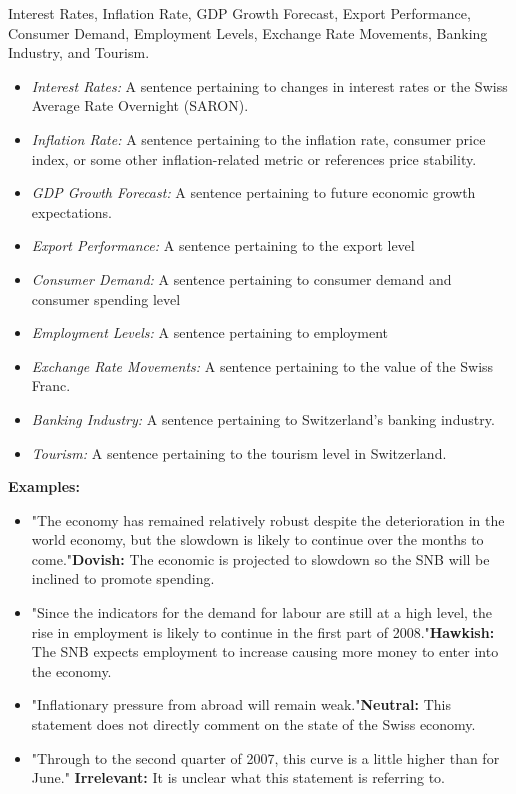  Interest Rates, Inflation Rate, GDP Growth Forecast, Export Performance, Consumer Demand, Employment Levels, Exchange Rate Movements, Banking Industry, and Tourism. 
\begin{itemize}
    \item \textit{Interest Rates: } A sentence pertaining to changes in interest rates or the Swiss Average Rate Overnight (SARON).
    \item \textit{Inflation Rate: }A sentence pertaining to the inflation rate, consumer price index, or some other inflation-related metric  or references price stability.
    \item \textit{GDP Growth Forecast: }A sentence pertaining to future economic growth expectations.
    \item \textit{Export Performance: }A sentence pertaining to the export level 
    \item \textit{Consumer Demand: }A sentence pertaining to consumer demand and consumer spending level  
    \item \textit{Employment Levels: }A sentence pertaining to employment
    \item \textit{Exchange Rate Movements: }A sentence pertaining to the value of the Swiss Franc.
    \item \textit{Banking Industry: }A sentence pertaining to Switzerland's banking industry.
    \item \textit{Tourism: }A sentence pertaining to the tourism level in Switzerland.
\end{itemize}


\textbf{Examples:}
\begin{itemize}
    \item "The economy has remained relatively robust despite the deterioration in the world economy, but the slowdown is likely to continue over the months to come."\newline\textbf{Dovish: }The economic is projected to slowdown so the SNB will be inclined to promote spending.
    \item "Since the indicators for the demand for labour are still at a high level, the rise in employment is likely to continue in the first part of 2008."\newline\textbf{Hawkish: }The SNB expects employment to increase causing more money to enter into the economy.
    \item "Inflationary pressure from abroad will remain weak."\newline\textbf{Neutral: }This statement does not directly comment on the state of the Swiss economy. 
    \item "Through to the second quarter of 2007, this curve is a little higher than for June."\newline
    \textbf{Irrelevant: }It is unclear what this statement is referring to. 
    
\end{itemize}


